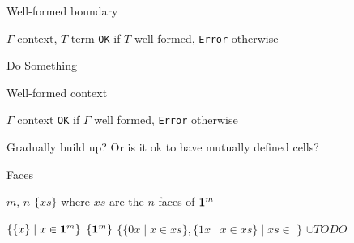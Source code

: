 



\begin{algorithm}[H]
  \caption{Well-formed boundary}\label{alg:wellformedboundary}
  \begin{algorithmic}
    \Require $\Gamma$ context, $T$ term
    \Ensure \texttt{OK} if $T$ well formed, \texttt{Error} otherwise

    \State Do Something
    \EndProcedure
  \end{algorithmic}
\end{algorithm}

\begin{algorithm}[H]
  \caption{Well-formed context}\label{alg:wellformedcontext}
  \begin{algorithmic}
    \Require $\Gamma$ context
    \Ensure \texttt{OK} if $\Gamma$ well formed, \texttt{Error} otherwise

    \State Gradually build up? Or is it ok to have mutually defined cells?
    \EndProcedure
  \end{algorithmic}
\end{algorithm}




\begin{algorithm}[H]
  \caption{Faces}\label{alg:faces}
  \begin{algorithmic}
    \Require $m$, $n$
    \Ensure $\{ xs \}$ where $xs$ are the $n$-faces of $\mathbf{1}^{m}$

    \State $\{ \{ x \} \mid x \in \mathbf{1}^{m} \}$
    \State $\{ \mathbf{1}^{m} \}$
    \Else
    \State $\{ \{ 0x \mid x \in xs \} , \{ 1x \mid x \in xs\} \mid xs \in $  $ \}$
    \Statex $\cup TODO$
    \EndIf
    \EndProcedure
    
  \end{algorithmic}
\end{algorithm}



